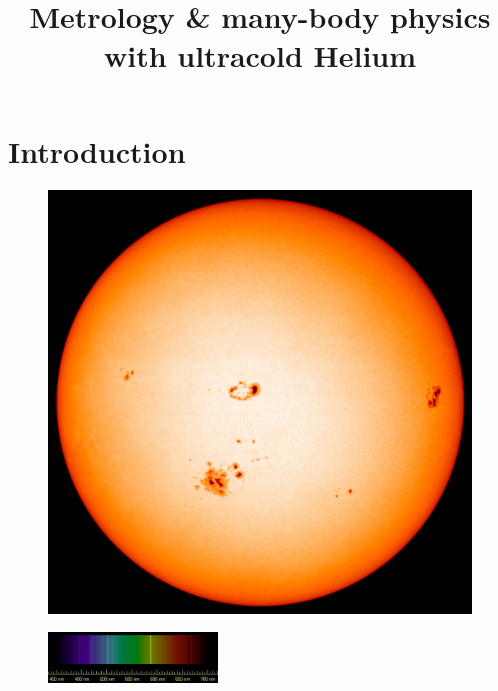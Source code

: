 \documentclass{beamer}
\title{Metrology \& many-body physics with ultracold Helium}
\author{}
\institute{He* BEC group, LPC}
\date{}
\begin{document}
 



\section*{Introduction}

{
\begin{frame}{}
\begin{center}
    \begin{figure}[h]
        \includegraphics[width=.7\textwidth]{figures/Intro/Sun.jpg}
    \end{figure}
    \begin{figure}[b]
        \includegraphics[width=0.4\textwidth]{figures/Intro/Spectrum.jpg}
    \end{figure}
\end{center}

\end{frame}}
\end{document}
